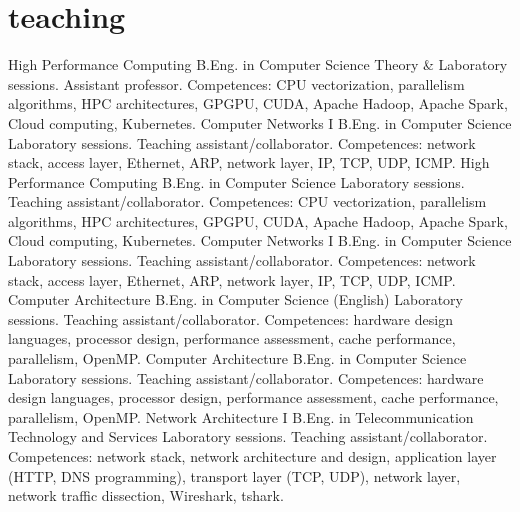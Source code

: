 \documentclass[]{friggeri-cv}
\begin{document}
\section{teaching}
\begin{entrylist}
{High Performance Computing}
{B.Eng. in Computer Science}
{Theory \& Laboratory sessions. Assistant professor. Competences: CPU vectorization, parallelism algorithms, HPC architectures, GPGPU, CUDA, Apache Hadoop, Apache Spark, Cloud computing, Kubernetes. 
}
{Computer Networks I}
{B.Eng. in Computer Science}
{Laboratory sessions. Teaching assistant/collaborator. Competences: network stack, access layer, Ethernet, ARP, network layer, IP, TCP, UDP, ICMP. 
}
{High Performance Computing}
{B.Eng. in Computer Science}
{Laboratory sessions. Teaching assistant/collaborator. Competences: CPU vectorization, parallelism algorithms, HPC architectures, GPGPU, CUDA, Apache Hadoop, Apache Spark, Cloud computing, Kubernetes. 
}
{Computer Networks I}
{B.Eng. in Computer Science}
{Laboratory sessions. Teaching assistant/collaborator. Competences: network stack, access layer, Ethernet, ARP, network layer, IP, TCP, UDP, ICMP. %
}
{Computer Architecture}
{B.Eng. in Computer Science (English)}
{Laboratory sessions. Teaching assistant/collaborator. Competences: hardware design languages, processor design, performance assessment, cache performance, parallelism, OpenMP. %
}
{Computer Architecture}
{B.Eng. in Computer Science}
{Laboratory sessions. Teaching assistant/collaborator. Competences: hardware design languages, processor design, performance assessment, cache performance, parallelism, OpenMP. %
}
{Network Architecture I}
{B.Eng. in Telecommunication Technology and Services}
{Laboratory sessions. Teaching assistant/collaborator. Competences: network stack, network architecture and design, application layer (HTTP, DNS programming), transport layer (TCP, UDP), network layer, network traffic dissection, Wireshark, tshark. %
}
\end{entrylist}
\end{document}
